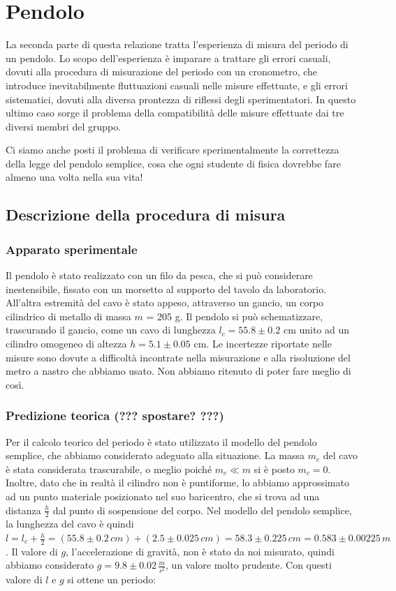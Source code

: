 \section{Pendolo}

La seconda parte di questa relazione tratta l'esperienza di misura del periodo
di un pendolo. Lo scopo dell'esperienza è imparare a trattare gli errori
casuali, dovuti alla procedura di misurazione del periodo con un cronometro,
che introduce inevitabilmente fluttuazioni casuali nelle misure effettuate,
e gli errori sistematici, dovuti alla diversa prontezza di riflessi degli
sperimentatori. In questo ultimo caso sorge il problema della 
compatibilità delle misure effettuate dai tre diversi membri del gruppo.

Ci siamo anche posti il problema di verificare sperimentalmente la
correttezza della legge del pendolo semplice, cosa che ogni studente di
fisica dovrebbe fare almeno una volta nella sua vita!

\subsection{Descrizione della procedura di misura}

\subsubsection{Apparato sperimentale}

Il pendolo è stato realizzato con un filo da pesca, che si può considerare
inestensibile, fissato con un morsetto al supporto del tavolo da laboratorio.
All'altra estremità del cavo è stato appeso, attraverso un gancio, un corpo
cilindrico di metallo di massa $m$ = 205 g. Il pendolo si può schematizzare,
trascurando il gancio, come un cavo di lunghezza $l_c = 55.8 \pm 0.2$ 
cm unito ad un cilindro omogeneo di altezza $h = 5.1 \pm 0.05$ cm.
Le incertezze riportate nelle misure sono dovute a difficoltà incontrate nella
misurazione e alla risoluzione del metro a nastro che abbiamo usato.
Non abbiamo ritenuto di poter fare meglio di così.

\subsubsection{Predizione teorica (??? spostare? ???)}

Per il calcolo teorico del periodo è stato utilizzato il modello del pendolo
semplice, che abbiamo considerato adeguato alla situazione. La massa $m_c$ del
cavo è stata considerata trascurabile, o meglio poiché $m_c \ll m$ si è posto
$m_c = 0$. Inoltre, dato che in realtà
il cilindro non è puntiforme, lo abbiamo approssimato ad un punto
materiale posizionato nel suo baricentro, che si trova ad una distanza
$\frac{h}{2}$ dal punto di sospensione del corpo.
Nel modello del pendolo semplice, la lunghezza del cavo è quindi
$l = l_c + \frac{h}{2} = (55.8 \pm 0.2 \, cm) + (2.5 \pm 0.025 \, cm) = 58.3 \pm 0.225 \, cm = 0.583 \pm 0.00225 \, m$.
Il valore di $g$, l'accelerazione di gravità, non è stato da noi misurato,
quindi abbiamo considerato $g = 9.8 \pm 0.02 \, \frac{m}{s^2}$, un
valore molto prudente. Con questi valore di $l$ e $g$ si ottene un periodo:

